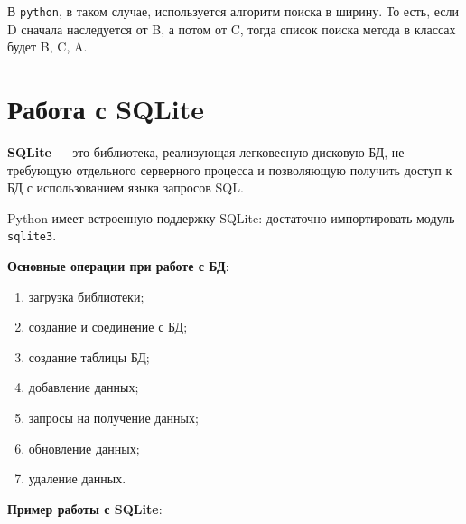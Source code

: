 \documentclass[a4paper,12pt,oneside]{extbook}
\begin{document}
В \texttt{python}, в таком случае, используется алгоритм поиска в ширину. То есть, если D сначала наследуется от B, а потом от C, тогда список поиска метода в классах будет B, C, A.

\section{Работа с SQLite}%
\label{sec:Работа с SQLite}

\textbf{SQLite} — это библиотека, реализующая легковесную дисковую БД, не требующую отдельного серверного процесса и позволяющую получить доступ к БД с использованием языка запросов SQL.

Python имеет встроенную поддержку SQLite: достаточно импортировать модуль \texttt{sqlite3}.

\textbf{Основные операции при работе с БД}:
\begin{enumerate}
    \item загрузка библиотеки;
    \item создание и соединение с БД;
    \item создание таблицы БД;
    \item добавление данных;
    \item запросы на получение данных;
    \item обновление данных;
    \item удаление данных.
\end{enumerate}

\textbf{Пример работы с SQLite}:
\inputminted{python}{./examples/sqlite_conn.py}
\end{document}
